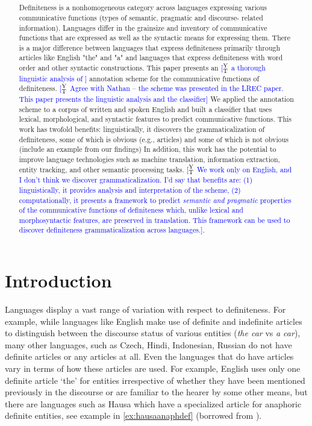 \documentclass[11pt,letterpaper]{article}
\title{\draftnotice{Title, author list not final. Page limit: 5 + 2 bib} \ab{Learning Definiteness across Languages using Classifiers} \nss{maybe: A Classification and Classifier for Cross-linguistic Functions of Definiteness}}
\date{}
\newcommand{\ensuretext}[1]{#1}
\newcommand{\ytmarker}{\ensuretext{\textcolor{blue}{\ensuremath{^{\textsc{Y}}_{\textsc{T}}}}}}
\newcommand{\arkcomment}[3]{\ensuretext{\textcolor{#3}{[#1 #2]}}}
\newcommand{\yt}[1]{\arkcomment{\ytmarker}{#1}{blue}}
\begin{document}
\maketitle
\begin{abstract}
Definiteness is a nonhomogeneous category across languages expressing various communicative functions (types of semantic, pragmatic and discourse- related information).   Languages differ in the grainsize and inventory of communicative functions  that are expressed as well as the syntactic means for expressing them.  There is a major difference between languages that express definiteness primarily through articles like English "the" and "a" and languages that express definiteness with word order and other syntactic constructions.   This paper presents an \yt{ a thorough linguistic analysis of } annotation scheme for the communicative functions of definiteness. \yt{Agree with Nathan -- the scheme was presented in the LREC paper. This paper presents the linguistic analysis and the classifier}  We applied the annotation scheme to a corpus of written and spoken English and built a classifier that uses lexical, morphological, and syntactic features to predict communicative functions.   This work has twofold benefits: linguistically, it discovers the grammaticalization of definiteness, some of which is obvious (e.g., articles) and some of which is not obvious (include an example from our findings) 
In addition, this work has the potential to improve language technologies such as machine translation, information extraction, entity tracking, and other semantic processing tasks. \yt{We work only on English, and I don't think we discover grammaticalization. I'd say that benefits are: (1) linguistically, it provides analysis and interpretation of the scheme, (2) computationally,  it presents a framework to predict \textit{semantic and pragmatic} properties of the communicative functions of definiteness which, unlike lexical and morphosyntactic features, are preserved in translation.  This framework can be used to discover definiteness grammaticalization across languages.}.  
\end{abstract}

\section{Introduction}

Languages display a vast range of variation with respect to definiteness. For example, while languages like English make use of definite and indefinite articles to distinguish between the discourse status of various entities ({\it the car} vs {\it a car}), many other languages, such as Czech, Hindi, Indonesian, Russian do not have definite articles or any articles at all. Even the languages that do have articles vary in terms of how these articles are used. For example, English uses only one definite article ‘the’ for entities irrespective of whether they have been mentioned previously in the discourse or are familiar to the hearer by some other means, but there are languages such as Hausa which have a specialized article for anaphoric definite entities, see example in \cref{ex:hausaanaphdef} (borrowed from \cite{lyons99}). 
\end{document}
